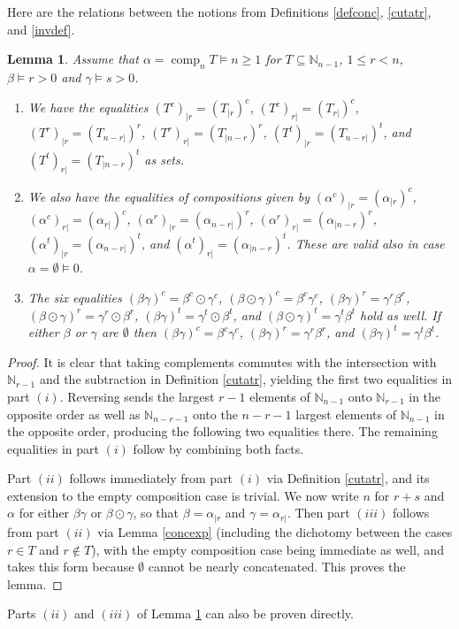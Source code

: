 \documentclass{article}
\newtheorem{lem}[thm]{Lemma}
\theoremstyle{definition}
\begin{document}
Here are the relations between the notions from Definitions \ref{defconc}, \ref{cutatr}, and \ref{invdef}.
\begin{lem}
Assume that $\alpha=\operatorname{comp}_{n}T \vDash n\geq1$ for $T\subseteq\mathbb{N}_{n-1}$, $1 \leq r<n$, $\beta \vDash r>0$ and $\gamma \vDash s>0$.
\begin{enumerate}[$(i)$]
\item We have the equalities $(T^{c})_{|r}=(T_{|r})^{c}$, $(T^{c})_{r|}=(T_{r|})^{c}$, $(T^{r})_{|r}=(T_{n-r|})^{r}$, $(T^{r})_{r|}=(T_{|n-r})^{r}$, $(T^{t})_{|r}=(T_{n-r|})^{t}$, and $(T^{t})_{r|}=(T_{|n-r})^{t}$ as sets.
\item We also have the equalities of compositions given by $(\alpha^{c})_{|r}=(\alpha_{|r})^{c}$, $(\alpha^{c})_{r|}=(\alpha_{r|})^{c}$, $(\alpha^{r})_{|r}=(\alpha_{n-r|})^{r}$, $(\alpha^{r})_{r|}=(\alpha_{|n-r})^{r}$, $(\alpha^{t})_{|r}=(\alpha_{n-r|})^{t}$, and $(\alpha^{t})_{r|}=(\alpha_{|n-r})^{t}$. These are valid also in case $\alpha=\emptyset\vDash0$.
\item The six equalities $(\beta\gamma)^{c}=\beta^{c}\odot\gamma^{c}$, $(\beta\odot\gamma)^{c}=\beta^{c}\gamma^{c}$, $(\beta\gamma)^{r}=\gamma^{r}\beta^{r}$, $(\beta\odot\gamma)^{r}=\gamma^{r}\odot\beta^{r}$, $(\beta\gamma)^{t}=\gamma^{t}\odot\beta^{t}$, and $(\beta\odot\gamma)^{t}=\gamma^{t}\beta^{t}$ hold as well. If either $\beta$ or $\gamma$ are $\emptyset$ then $(\beta\gamma)^{c}=\beta^{c}\gamma^{c}$, $(\beta\gamma)^{r}=\gamma^{r}\beta^{r}$, and $(\beta\gamma)^{t}=\gamma^{t}\beta^{t}$.
\end{enumerate} \label{relsinv}
\end{lem}

\begin{proof}
It is clear that taking complements commutes with the intersection with $\mathbb{N}_{r-1}$ and the subtraction in Definition \ref{cutatr}, yielding the first two equalities in part $(i)$. Reversing sends the largest $r-1$ elements of $\mathbb{N}_{n-1}$ onto $\mathbb{N}_{r-1}$ in the opposite order as well as $\mathbb{N}_{n-r-1}$ onto the $n-r-1$ largest elements of $\mathbb{N}_{n-1}$ in the opposite order, producing the following two equalities there. The remaining equalities in part $(i)$ follow by combining both facts.

Part $(ii)$ follows immediately from part $(i)$ via Definition \ref{cutatr}, and its extension to the empty composition case is trivial. We now write $n$ for $r+s$ and $\alpha$ for either $\beta\gamma$ or $\beta\odot\gamma$, so that $\beta=\alpha_{|r}$ and $\gamma=\alpha_{r|}$. Then part $(iii)$ follows from part $(ii)$ via Lemma \ref{concexp} (including the dichotomy between the cases $r \in T$ and $r \not\in T$), with the empty composition case being immediate as well, and takes this form because $\emptyset$ cannot be nearly concatenated. This proves the lemma.
\end{proof}
Parts $(ii)$ and $(iii)$ of Lemma \ref{relsinv} can also be proven directly.
\end{document}
